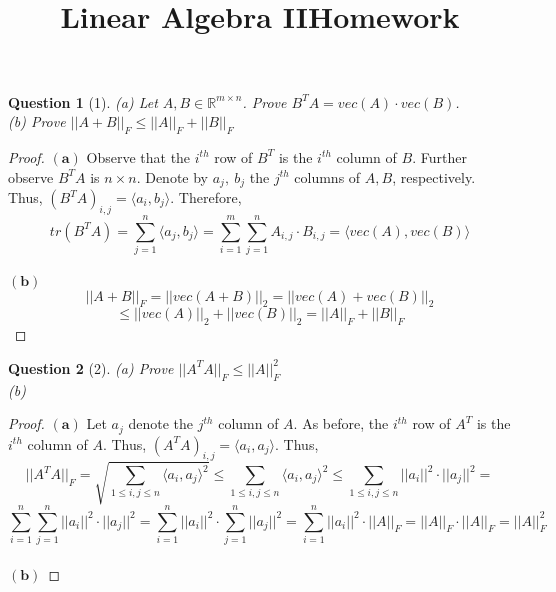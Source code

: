 \documentclass[11pt]{article}
\title{\vspace{-50pt}
\Huge \name
\\\vspace{20pt}
\huge Linear Algebra II\hfill Homework \hw}
\author{}
\date{}
\theoremstyle{quest}
\newtheorem*{question}{Question}
\begin{document}
\maketitle

\begin{question}[1]
(a) Let $A, B \in \mathbb{R}^{m \times n}$. Prove $B^TA = vec(A) \cdot vec(B)$.
\\(b) Prove $||A + B||_F \le ||A||_F + ||B||_F$
\end{question}
\begin{proof}
$\mathbf{(a)}$ Observe that the $i^{th}$ row of $B^T$ is the $i^{th}$ column of $B$. Further observe $B^TA$ is $n \times n$. Denote by $a_j,\ b_j$ the $j^{th}$ columns of $A, B$, respectively.
\\Thus, $(B^TA)_{i,j} = \langle a_i, b_j \rangle$. Therefore,
$$tr(B^TA) = \sum_{j=1}^n \langle a_j, b_j \rangle = \sum_{i=1}^m \sum_{j=1}^n A_{i, j} \cdot B_{i, j} = \langle vec(A), vec(B)\rangle$$
\\$\mathbf{(b)}$
$$||A+B||_F = ||vec(A+B)||_2 = ||vec(A) + vec(B)||_2$$ $$\le ||vec(A)||_2 + ||vec(B)||_2 = ||A||_F + ||B||_F$$
\end{proof}
\begin{question}[2]
(a) Prove $||A^TA||_F \le ||A||_F^2$
\\(b)
\end{question}
\begin{proof}
$\mathbf{(a)}$ Let $a_j$ denote the $j^{th}$ column of $A$. As before, the $i^{th}$ row of $A^T$ is the $i^{th}$ column of $A$. Thus, $(A^TA)_{i,j} = \langle a_i, a_j \rangle$. Thus,
$$||A^TA||_F = \sqrt{\sum_{1 \le i,j \le n} \langle a_i, a_j \rangle^2} \le \sum_{1 \le i,j \le n} \langle a_i, a_j \rangle^2 \le \sum_{1 \le i,j \le n} ||a_i||^2 \cdot ||a_j||^2 = $$ 
$$\sum_{i=1}^n \sum_{j=1}^n ||a_i||^2 \cdot ||a_j||^2 =\sum_{i=1}^n ||a_i||^2 \cdot \sum_{j=1}^n  ||a_j||^2 = \sum_{i=1}^n ||a_i||^2 \cdot ||A||_F = ||A||_F \cdot ||A||_F = ||A||_F^2$$
\\$\mathbf{(b)}$
\end{proof}
\end{document}
